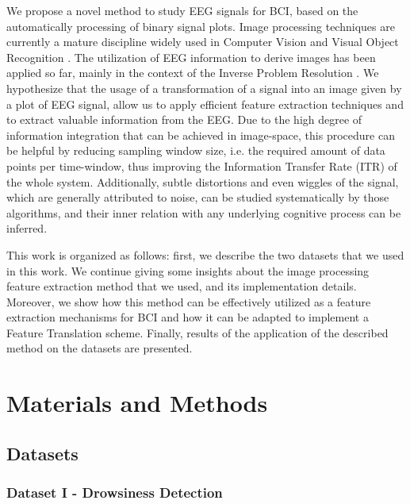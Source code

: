 \documentclass[nouppercase]{ifmbe}
\begin{document}
We propose a novel method to study EEG signals for BCI, based on the automatically processing of binary signal plots. Image processing techniques are currently a mature discipline widely used in Computer Vision and Visual Object Recognition \cite{c9}.  The utilization of EEG information to derive images has been applied so far, mainly in the context of the Inverse Problem Resolution \cite{c61}.  We hypothesize that the usage of a transformation of a signal into an image given by a plot of EEG signal, allow us to apply efficient feature extraction techniques and to extract valuable information from the EEG.  Due to the high degree of information integration that can be achieved in image-space, this procedure can be helpful by reducing sampling window size, i.e. the required amount of data points per time-window, thus improving the Information Transfer Rate (ITR) of the whole system.  Additionally, subtle distortions and even wiggles of the signal, which are generally attributed to noise, can be studied systematically by those algorithms, and their inner relation with any underlying cognitive process can be inferred.



This work is organized as follows: first, we describe the two datasets that we used in this work.  We continue giving some insights about the image processing feature extraction method that we used, and its implementation details.  Moreover, we show how this method  can be effectively utilized as a feature extraction mechanisms for BCI and how it can be adapted to implement a Feature Translation scheme.  Finally, results of the application of the described method on the datasets are presented.

\section{Materials and Methods}

\subsection{Datasets}


\subsubsection{Dataset I - Drowsiness Detection}
\end{document}
